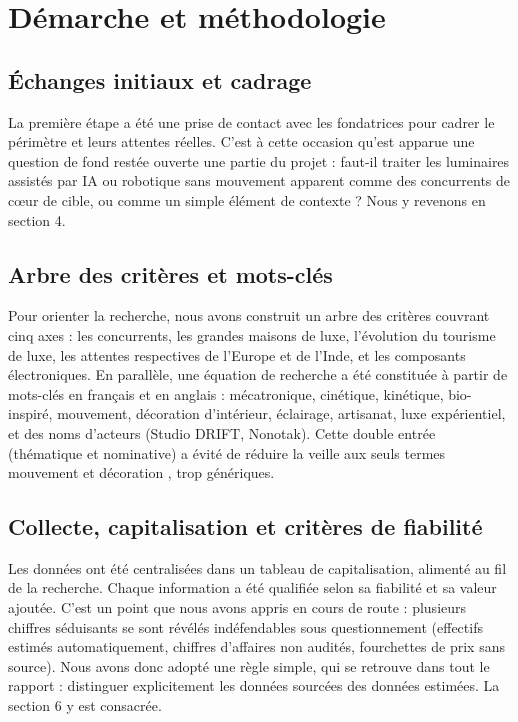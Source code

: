 \documentclass[11pt,a4paper]{article}
\begin{document}
\section{Démarche et méthodologie}

\subsection{Échanges initiaux et cadrage}

La première étape a été une prise de contact avec les fondatrices pour cadrer le périmètre et leurs attentes réelles. C'est à cette occasion qu'est apparue une question de fond restée ouverte une partie du projet : faut-il traiter les luminaires assistés par IA ou robotique sans mouvement apparent comme des concurrents de c\oe ur de cible, ou comme un simple élément de contexte ? Nous y revenons en section 4.

\subsection{Arbre des critères et mots-clés}

Pour orienter la recherche, nous avons construit un arbre des critères couvrant cinq axes : les concurrents, les grandes maisons de luxe, l'évolution du tourisme de luxe, les attentes respectives de l'Europe et de l'Inde, et les composants électroniques. En parallèle, une équation de recherche a été constituée à partir de mots-clés en français et en anglais : mécatronique, cinétique, kinétique, bio-inspiré, mouvement, décoration d'intérieur, éclairage, artisanat, luxe expérientiel, et des noms d'acteurs (Studio DRIFT, Nonotak). Cette double entrée (thématique et nominative) a évité de réduire la veille aux seuls termes \og mouvement \fg{} et \og décoration \fg{}, trop génériques.

\subsection{Collecte, capitalisation et critères de fiabilité}

Les données ont été centralisées dans un tableau de capitalisation, alimenté au fil de la recherche. Chaque information a été qualifiée selon sa fiabilité et sa valeur ajoutée. C'est un point que nous avons appris en cours de route : plusieurs chiffres séduisants se sont révélés indéfendables sous questionnement (effectifs estimés automatiquement, chiffres d'affaires non audités, fourchettes de prix sans source). Nous avons donc adopté une règle simple, qui se retrouve dans tout le rapport : distinguer explicitement les données sourcées des données estimées. La section 6 y est consacrée.
\end{document}
